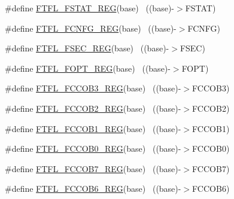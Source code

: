 \begin{DoxyCompactItemize}
\item 
\#define \hyperlink{group___f_t_f_l___register___accessor___macros_ga61843e4cd8d028e949b2bcef7580f03d}{F\+T\+F\+L\+\_\+\+F\+S\+T\+A\+T\+\_\+\+R\+EG}(base)                                      ~((base)-\/$>$F\+S\+T\+AT)
\item 
\#define \hyperlink{group___f_t_f_l___register___accessor___macros_gad717b12e5cd4f849ad44ccc811a25685}{F\+T\+F\+L\+\_\+\+F\+C\+N\+F\+G\+\_\+\+R\+EG}(base)                                      ~((base)-\/$>$F\+C\+N\+FG)
\item 
\#define \hyperlink{group___f_t_f_l___register___accessor___macros_ga24c533d0a36f2a369d16c5801fa99c90}{F\+T\+F\+L\+\_\+\+F\+S\+E\+C\+\_\+\+R\+EG}(base)                                        ~((base)-\/$>$F\+S\+EC)
\item 
\#define \hyperlink{group___f_t_f_l___register___accessor___macros_gaa19b55e321560f11e71f7cba374dbe7e}{F\+T\+F\+L\+\_\+\+F\+O\+P\+T\+\_\+\+R\+EG}(base)                                        ~((base)-\/$>$F\+O\+PT)
\item 
\#define \hyperlink{group___f_t_f_l___register___accessor___macros_gafb6ad80128940470498489c7ca3c1f6b}{F\+T\+F\+L\+\_\+\+F\+C\+C\+O\+B3\+\_\+\+R\+EG}(base)                                    ~((base)-\/$>$F\+C\+C\+O\+B3)
\item 
\#define \hyperlink{group___f_t_f_l___register___accessor___macros_ga12697c398db5990129d2f65ced25b3cc}{F\+T\+F\+L\+\_\+\+F\+C\+C\+O\+B2\+\_\+\+R\+EG}(base)                                    ~((base)-\/$>$F\+C\+C\+O\+B2)
\item 
\#define \hyperlink{group___f_t_f_l___register___accessor___macros_gab99efa5cba6e3a97a61634ff367e38d2}{F\+T\+F\+L\+\_\+\+F\+C\+C\+O\+B1\+\_\+\+R\+EG}(base)                                    ~((base)-\/$>$F\+C\+C\+O\+B1)
\item 
\#define \hyperlink{group___f_t_f_l___register___accessor___macros_ga6e99a315254057699b17fca8421e31f8}{F\+T\+F\+L\+\_\+\+F\+C\+C\+O\+B0\+\_\+\+R\+EG}(base)                                    ~((base)-\/$>$F\+C\+C\+O\+B0)
\item 
\#define \hyperlink{group___f_t_f_l___register___accessor___macros_ga4dc682960fb3bdce9c012b91a56e8ec1}{F\+T\+F\+L\+\_\+\+F\+C\+C\+O\+B7\+\_\+\+R\+EG}(base)                                    ~((base)-\/$>$F\+C\+C\+O\+B7)
\item 
\#define \hyperlink{group___f_t_f_l___register___accessor___macros_ga0187db09b3ffc38e4c0202b3e1764b3f}{F\+T\+F\+L\+\_\+\+F\+C\+C\+O\+B6\+\_\+\+R\+EG}(base)                                    ~((base)-\/$>$F\+C\+C\+O\+B6)

\end{DoxyCompactItemize}

